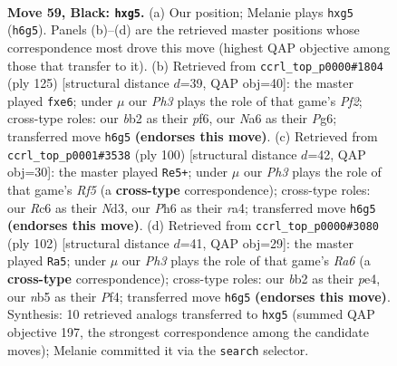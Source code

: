 \documentclass[11pt]{article}
\begin{document}
\clearpage

\begin{figure}[p]\centering
\begin{subfigure}{0.46\textwidth}\centering
\resizebox{\linewidth}{!}{%
\newchessgame
\chessboard[
  setfen={6k1/4p3/npr4p/pN4P1/P1p5/2P3K1/1B1R4/8 b - - 0 59},
  showmover=false,
  pgfstyle=straightmove, color=movearrow, markmove={h6-g5}
]}
\caption{}
\end{subfigure}\hfill
\begin{subfigure}{0.46\textwidth}\centering
\resizebox{\linewidth}{!}{%
\newchessgame
\chessboard[
  setfen={8/r4p1k/1p2PPp1/1P6/4Nb2/5PpP/8/1R3K2 b - - 0 63},
  showmover=false,
  pgfstyle=straightmove, color=movearrow, markmove={f7-e6}
]}
\caption{}
\end{subfigure}
\\[4pt]
\begin{subfigure}{0.46\textwidth}\centering
\resizebox{\linewidth}{!}{%
\newchessgame
\chessboard[
  setfen={4kb2/1p6/pP5p/P1P2R2/r5p1/3N4/7P/7K w - - 9 51},
  showmover=false,
  pgfstyle=straightmove, color=movearrow, markmove={f5-e5}
]}
\caption{}
\end{subfigure}\hfill
\begin{subfigure}{0.46\textwidth}\centering
\resizebox{\linewidth}{!}{%
\newchessgame
\chessboard[
  setfen={8/p1r3k1/R1P2p2/5p1p/P3pP1P/6P1/4K3/8 w - - 11 52},
  showmover=false,
  pgfstyle=straightmove, color=movearrow, markmove={a6-a5}
]}
\caption{}
\end{subfigure}
\caption{\textbf{Move 59, Black: \texttt{hxg5}.} (a) Our position; Melanie plays \texttt{hxg5} (\texttt{h6g5}). Panels (b)--(d) are the retrieved master positions whose correspondence most drove this move (highest QAP objective among those that transfer to it). (b) Retrieved from \texttt{ccrl\_top\_p0000\#1804} (ply 125) [structural distance $d$=39, QAP obj=40]: the master played \texttt{fxe6}; under $\mu$ our \emph{Ph3} plays the role of that game's \emph{Pf2}; cross-type roles: our \emph{b}b2 as their \emph{p}f6, our \emph{N}a6 as their \emph{P}g6; transferred move \texttt{h6g5} \textbf{(endorses this move)}. (c) Retrieved from \texttt{ccrl\_top\_p0001\#3538} (ply 100) [structural distance $d$=42, QAP obj=30]: the master played \texttt{Re5+}; under $\mu$ our \emph{Ph3} plays the role of that game's \emph{Rf5} (a \textbf{cross-type} correspondence); cross-type roles: our \emph{R}c6 as their \emph{N}d3, our \emph{P}h6 as their \emph{r}a4; transferred move \texttt{h6g5} \textbf{(endorses this move)}. (d) Retrieved from \texttt{ccrl\_top\_p0000\#3080} (ply 102) [structural distance $d$=41, QAP obj=29]: the master played \texttt{Ra5}; under $\mu$ our \emph{Ph3} plays the role of that game's \emph{Ra6} (a \textbf{cross-type} correspondence); cross-type roles: our \emph{b}b2 as their \emph{p}e4, our \emph{n}b5 as their \emph{P}f4; transferred move \texttt{h6g5} \textbf{(endorses this move)}. Synthesis: 10 retrieved analogs transferred to \texttt{hxg5} (summed QAP objective 197, the strongest correspondence among the candidate moves); Melanie committed it via the \texttt{search} selector.}
\label{fig:thought-m117}
\end{figure}
\end{document}
